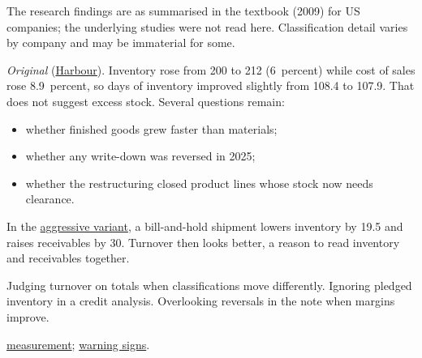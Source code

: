 \begin{qfmethod}
 The research findings are as summarised in the textbook (2009) for US companies; the underlying studies were not read here. Classification detail varies by company and may be immaterial for some.

 \emph{Original} (\hyperref[ex:harbour-tools-statements]{Harbour}). Inventory rose from 200 to 212 (6~percent) while cost of sales rose 8.9~percent, so days of inventory improved slightly from 108.4 to 107.9. That does not suggest excess stock. Several questions remain:
\begin{itemize}
\item whether finished goods grew faster than materials;
\item whether any write-down was reversed in 2025;
\item whether the restructuring closed product lines whose stock now needs clearance.
\end{itemize}
In the \hyperref[meth:report-quality-evaluation]{aggressive variant}, a bill-and-hold shipment lowers inventory by 19.5 and raises receivables by 30. Turnover then looks better, a reason to read inventory and receivables together.

 Judging turnover on totals when classifications move differently. Ignoring pledged inventory in a credit analysis. Overlooking reversals in the note when margins improve.

 \hyperref[meth:inventory-measurement-nrv]{measurement}; \hyperref[meth:reporting-warning-signs]{warning signs}.

\end{qfmethod}
